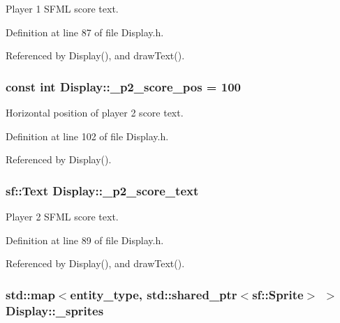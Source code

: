 Player 1 S\-F\-M\-L score text. 



Definition at line 87 of file Display.\-h.



Referenced by Display(), and draw\-Text().

\hypertarget{classDisplay_a223efbfb6036d823dbaf09e4180a07fb}{
\subsubsection[{\-\_\-p2\-\_\-score\-\_\-pos}]{\setlength{\rightskip}{0pt plus 5cm}const int Display\-::\-\_\-p2\-\_\-score\-\_\-pos = 100\hspace{0.3cm}{\ttfamily [private]}}}\label{classDisplay_a223efbfb6036d823dbaf09e4180a07fb}


Horizontal position of player 2 score text. 



Definition at line 102 of file Display.\-h.



Referenced by Display().

\hypertarget{classDisplay_a80ea7a2642db4a379d756b0132d26343}{
\subsubsection[{\-\_\-p2\-\_\-score\-\_\-text}]{\setlength{\rightskip}{0pt plus 5cm}sf\-::\-Text Display\-::\-\_\-p2\-\_\-score\-\_\-text\hspace{0.3cm}{\ttfamily [private]}}}\label{classDisplay_a80ea7a2642db4a379d756b0132d26343}


Player 2 S\-F\-M\-L score text. 



Definition at line 89 of file Display.\-h.



Referenced by Display(), and draw\-Text().

\hypertarget{classDisplay_a975326ca007706c154317ddef67000f4}{
\subsubsection[{\-\_\-sprites}]{\setlength{\rightskip}{0pt plus 5cm}std\-::map$<${\bf entity\-\_\-type}, std\-::shared\-\_\-ptr$<$sf\-::\-Sprite$>$ $>$ Display\-::\-\_\-sprites\hspace{0.3cm}{\ttfamily [private]}}}\label{classDisplay_a975326ca007706c154317ddef67000f4}


